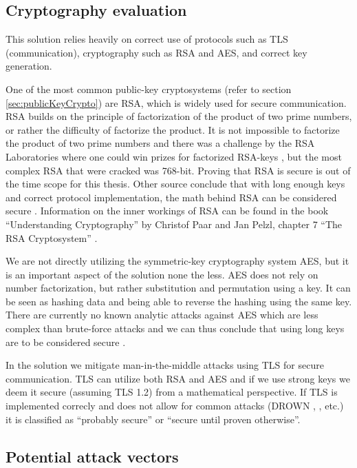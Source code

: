 \subsection{Cryptography evaluation}
This solution relies heavily on correct use of protocols such as TLS (communication), cryptography such as RSA and AES, and correct key generation.

One of the most common public-key cryptosystems (refer to section \ref{sec:publicKeyCrypto}) are RSA, which is widely used for secure communication. RSA builds on the principle of factorization of the product of two prime numbers, or rather the difficulty of factorize the product. It is not impossible to factorize the product of two prime numbers and there was a challenge by the RSA Laboratories where one could win prizes for factorized RSA-keys \cite{rsaChallenge}, but the most complex RSA that were cracked was 768-bit. Proving that RSA is secure is out of the time scope for this thesis. Other source conclude that with long enough keys and correct protocol implementation, the math behind RSA can be considered secure \cite[~p. 194]{cryptoMath}. Information on the inner workings of RSA can be found in the book ``Understanding Cryptography'' by Christof Paar and Jan Pelzl, chapter 7 ``The RSA Cryptosystem'' \cite{cryptoMath}.

We are not directly utilizing the symmetric-key cryptography system AES, but it is an important aspect of the solution none the less. AES does not rely on number factorization, but rather substitution and permutation using a key. It can be seen as hashing data and being able to reverse the hashing using the same key. There are currently no known analytic attacks against AES which are less complex than brute-force attacks and we can thus conclude that using long keys are to be considered secure \cite[~p. 116-117]{cryptoMath}.

In the solution we mitigate man-in-the-middle attacks using TLS for secure communication. TLS can utilize both RSA and AES and if we use strong keys we deem it secure (assuming TLS 1.2) from a mathematical perspective. If TLS is implemented correcly and does not allow for common attacks (DROWN \cite{drown}, , etc.) it is classified as ``probably secure'' or ``secure until proven otherwise''.



\subsection{Potential attack vectors}
\label{sec:attackVectors}

